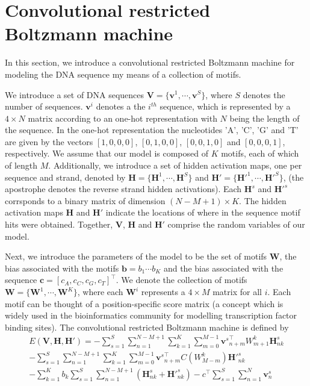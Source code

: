 \documentclass[12pt]{article}
\begin{document}
\section{Convolutional restricted Boltzmann machine}
In this section, we introduce a convolutional restricted
Boltzmann machine for modeling the DNA sequence my means
of a collection of motifs.\par
We introduce a set of DNA sequences $\mathbf{V}=\{\mathbf{v}^1,\cdots,\mathbf{v}^S\}$, where
$S$ denotes the number of sequences.
 $\mathbf{v}^i$ denotes a the $i^{th}$ sequence, which is represented by a $4\times N$ matrix
according to an one-hot representation with $N$ being the length of the sequence.
In the one-hot representation the nucleotides 'A', 'C', 'G' and 'T' are given
by the vectors $[1,0,0,0]$, $[0,1,0,0]$, $[0,0,1,0]$ and  $[0,0,0,1]$, respectively.
We assume that our model is composed of $K$ motifs, each of
which of length $M$.
Additionally, we introduce a set of hidden activation
maps, one per sequence  and strand, denoted by 
$\mathbf{H}=\{\mathbf{H}^{1}, \cdots, \mathbf{H}^{S}\}$ 
and ${\mathbf{H}'}=\{\mathbf{H'}^{1}, \cdots, \mathbf{H'}^{S}\}$, 
 (the apostrophe denotes the reverse strand hidden activations).
Each $\mathbf{H}^s$ and ${\mathbf{H}'}^s$ corrsponds to
a binary matrix of dimension $(N-M+1)\times K$.
The hidden activation maps $\mathbf{H}$ and $\mathbf{H}'$ indicate the locations of where 
in the sequence motif hits were obtained.
Together, $\mathbf{V}$, $\mathbf{H}$ and $\mathbf{H}'$ comprise the random variables of our model.\par
Next, we introduce the parameters of the model to be the set of motifs $\mathbf{W}$,
the bias associated with the motifs $\mathbf{b}=b_1\cdots b_K$ and the bias associated with the sequence $\mathbf{c}=[c_A,c_C,c_G,c_T]^\top$.
We denote the collection of motifs $\mathbf{W}=\{\mathbf{W}^1,\cdots, \mathbf{W}^K\}$, where each $\mathbf{W}^i$
represents a $4 \times M$ matrix for all $i$.
Each motif can be thought of a position-specific score matrix (a concept which is widely 
used in the bioinformatics community for modelling  transcription factor binding sites).
The convolutional restricted Boltzmann machine is defined by
\begin{align}
	E(\mathbf{V},\mathbf{H}, {\mathbf{H}'})=
	-\sum_{s=1}^S\sum_{n=1}^{N-M+1}\sum_{k=1}^K\sum_{m=0}^{M-1} 
	  {\mathbf{v}^s}_{n+m}^\top W_{m+1}^k \mathbf{H}_{nk}^s \nonumber\\
	-\sum_{s=1}^S\sum_{n=1}^{N-M+1}\sum_{k=1}^K\sum_{m=0}^{M-1} 
	  {\mathbf{v}^s}_{n+m}^\top C(W_{M-m}^k) {\mathbf{H}'}_{nk}^s\nonumber\\
	- \sum_{k=1}^K b_k \sum_{s=1}^S\sum_{n=1}^{N-M+1}(\mathbf{H}_{nk}^s + {\mathbf{H}'}_{nk}^s)
	-c^\top \sum_{s=1}^S\sum_{n=1}^{N}\mathbf{v}^s_n
\end{align}
\end{document}
